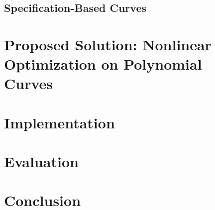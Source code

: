 \documentclass[a4paper]{article}
\begin{document}
		\subsection{Specification-Based Curves}


	\section{Proposed Solution: Nonlinear Optimization on Polynomial Curves}


	\section{Implementation}

	\section{Evaluation}


	\section{Conclusion}
\end{document}
